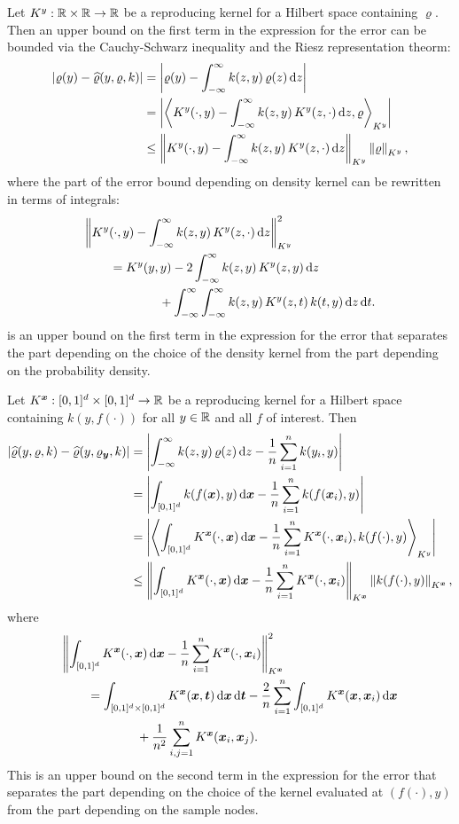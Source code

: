 \documentclass{amsart}
\newcommand{\hvarrho}{\widehat{\varrho}}
\newcommand{\KY}{K^y}
\newcommand{\KX}{K^{\vx}}
\begin{document}
Let $\KY:\reals \times \reals \to \reals$ be a reproducing kernel for a Hilbert space containing $\varrho$.  Then an upper bound on the first term in the expression for the error can be bounded via the Cauchy-Schwarz inequality and the Riesz representation theorm:
\begin{align}
\label{eq:firstbd}
\abs{\varrho(y) - \hvarrho(y,\varrho,k)}
& = \abs{\varrho(y) - \int_{-\infty}^{\infty} k(z,y) \, \varrho(z) \, \dif z} \\
\nonumber
& = \abs{\ip[\KY]{\KY(\cdot,y) - \int_{-\infty}^{\infty} k(z,y) \, \KY(z,\cdot) \,  \dif z}{\varrho} } \\
\nonumber
& \le  \norm[\KY]{\KY(\cdot,y) - \int_{-\infty}^{\infty} k(z,y) \, \KY(z,\cdot) \, \dif z} \norm[\KY]{\varrho},
\end{align}
where the part of the error bound depending on density kernel can be rewritten in terms of integrals:
\begin{align}
\label{eq:kquality}
\MoveEqLeft{\norm[\KY]{\KY(\cdot,y) - \int_{-\infty}^{\infty} k(z,y) \, \KY(z,\cdot) \, \dif z}^2} \\ \nonumber
&=  \KY(y,y) - 2 \int_{-\infty}^{\infty} k(z,y) \, \KY(z,y) \, \dif z \\ \nonumber
& \qquad \qquad + \int_{-\infty}^{\infty} \int_{-\infty}^{\infty}  k(z,y) \, \KY(z,t) \, k(t,y)\, \dif z \, \dif t.
\end{align}
 is an upper bound on the first term in the expression for the error that separates the part depending on the choice of the density kernel from the part depending on the probability density.

Let $\KX: [0,1]^d \times [0,1]^d\to \reals$ be a reproducing kernel for a Hilbert space containing $k(y,f(\cdot))$ for all $y \in \mathbb{R}$ and all $f$ of interest. Then
\begin{align*}
\abs{\hvarrho(y,\varrho,k) - \hvarrho(y,\varrho_{\vy},k)}
& = \abs{\int_{-\infty}^{\infty} k(z,y) \, \varrho(z) \, \dif z -
\frac 1n \sum_{i=1}^n k(y_i,y)} \\
& = \abs{\int_{[0,1]^d} k(f(\vx),y) \, \dif \vx -
\frac 1n \sum_{i=1}^n k(f(\vx_i),y)} \\
& = \abs{\ip[\KY]{\int_{[0,1]^d} \KX(\cdot,\vx) \, \dif \vx -
\frac 1n \sum_{i=1}^n \KX(\cdot,\vx_i)}{k(f(\cdot),y) }} \\
& \le  \norm[\KX]{\int_{[0,1]^d} \KX(\cdot,\vx) \, \dif \vx -
\frac 1n \sum_{i=1}^n \KX(\cdot,\vx_i)} \norm[\KX]{k(f(\cdot),y) } ,
\end{align*}
where
\begin{align*}
\MoveEqLeft{\norm[\KX]{\int_{[0,1]^d} \KX(\cdot,\vx) \, \dif \vx -
\frac 1n \sum_{i=1}^n \KX(\cdot,\vx_i)}^2} \\
&=  \int_{[0,1]^d \times [0,1]^d} \KX(\vx,\vt) \, \dif \vx \, \dif \vt -
\frac 2n \sum_{i=1}^n \int_{[0,1]^d} \KX(\vx,\vx_i) \, \dif \vx \\
& \qquad \qquad + \frac 1{n^2} \sum_{i,j=1}^n  \KX(\vx_i,\vx_j) .
\end{align*}
This is an upper bound on the second term in the expression for the error that separates the part depending on the choice of the kernel evaluated at $(f(\cdot),y)$ from the part depending on the sample nodes.
\end{document}
